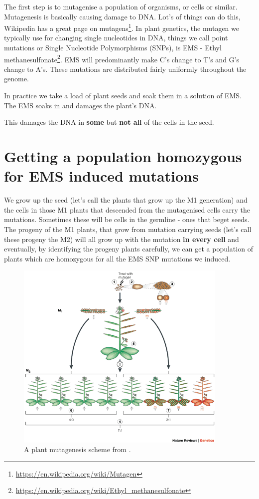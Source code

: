 \documentclass[12pt,]{book}
\let\rmarkdownfootnote\footnote%
\def\footnote{\protect\rmarkdownfootnote}
\renewcommand{\href}[2]{#2\footnote{\url{#1}}}
\theoremstyle{definition}
\theoremstyle{definition}
\theoremstyle{remark}
\begin{document}
The first step is to mutagenise a population of organisms, or cells or
similar. Mutagenesis is basically causing damage to DNA. Lot's of things
can do this, Wikipedia has a great page on
\href{https://en.wikipedia.org/wiki/Mutagen}{mutagens}. In plant
genetics, the mutagen we typically use for changing single nucleotides
in DNA, things we call point mutations or Single Nucleotide
Polymorphisms (SNPs), is EMS -
\href{https://en.wikipedia.org/wiki/Ethyl_methanesulfonate}{Ethyl
methanesulfonate}. EMS will predominantly make C's change to T's and G's
change to A's. These mutations are distributed fairly uniformly
throughout the genome.

In practice we take a load of plant seeds and soak them in a solution of
EMS. The EMS soaks in and damages the plant's DNA.

This damages the DNA in \textbf{some} but \textbf{not all} of the cells
in the seed.

\section{Getting a population homozygous for EMS induced
mutations}\label{getting-a-population-homozygous-for-ems-induced-mutations}

We grow up the seed (let's call the plants that grow up the M1
generation) and the cells in those M1 plants that descended from the
mutagenised cells carry the mutations. Sometimes these will be cells in
the germline - ones that beget seeds. The progeny of the M1 plants, that
grow from mutation carrying seeds (let's call these progeny the M2) will
all grow up with the mutation \textbf{in every cell} and eventually, by
identifying the progeny plants carefully, we can get a population of
plants which are homozygous for all the EMS SNP mutations we induced.



\begin{figure}
\includegraphics[width=4in]{assets/nrg730-i2} \caption{A plant mutagenesis scheme from \citet{Page:2002vm}.}\label{fig:mutagenesis}
\end{figure}
\end{document}
